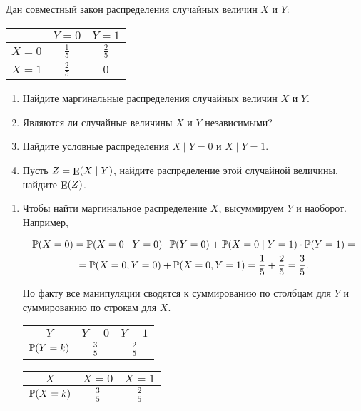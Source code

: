 \begin{problem}
Дан совместный закон распределения случайных величин $X$ и $Y$:	
	\begin{center}
		\begin{tabular}{c|c|c}
			&  $Y = 0$    &  $Y = 1$   \\ \hline
			$X = 0$   & $\frac{1}{5}$     &  $\frac{2}{5}$ \\ \hline
			$X = 1$    & $\frac{2}{5}$    &  $0$ \\
		\end{tabular}
	\end{center}

\begin{enumerate}
\item Найдите маргинальные распределения случайных величин $X$ и $Y$. 
\item Являются ли случайные величины $X$ и $Y$ независимыми? 
\item Найдите условные распределения  $X \mid Y = 0$  и $X \mid Y=1$.
\item Пусть $Z = \operatorname{\mathop{E}}(X \mid Y)$, найдите распределение этой случайной величины, найдите $\operatorname{\mathop{E}}(Z)$.
\end{enumerate} 

\begin{sol}
\begin{enumerate}
	\item  Чтобы найти маргинальное распределение $X$, высуммируем $Y$ и наоборот. Например, 
	
	\begin{multline*}
	\mathbb{P}(X = 0) = \mathbb{P}(X = 0 \mid Y =0) \cdot \mathbb{P}(Y=0) + \mathbb{P}(X = 0 \mid Y = 1) \cdot \mathbb{P}(Y = 1) = \\ = \mathbb{P}(X = 0, Y=0) + \mathbb{P}(X = 0, Y = 1) = \frac{1}{5} + \frac{2}{5} = \frac{3}{5}.
	\end{multline*}
	
По факту все  манипуляции сводятся к суммированию по столбцам для $Y$ и суммированию по строкам для $X$. 
	
	\begin{minipage}[t]{0.45\textwidth}
		\begin{tabular}{c|c|c}
			$Y$&  $Y = 0$    &  $Y = 1$   \\ \hline
			$\mathbb{P}(Y=k)$   & $\frac{3}{5}$     &  $\frac{2}{5}$ 
		\end{tabular}
	\end{minipage}
	\begin{minipage}[t]{0.45\textwidth}
		\begin{tabular}{c|c|c}
			$X$&  $X = 0$    &  $X = 1$   \\ \hline
			$\mathbb{P}(X=k)$   & $\frac{3}{5}$     &  $\frac{2}{5}$ 
		\end{tabular}
	\end{minipage}
	

\end{enumerate}
\end{sol}
\end{problem}
